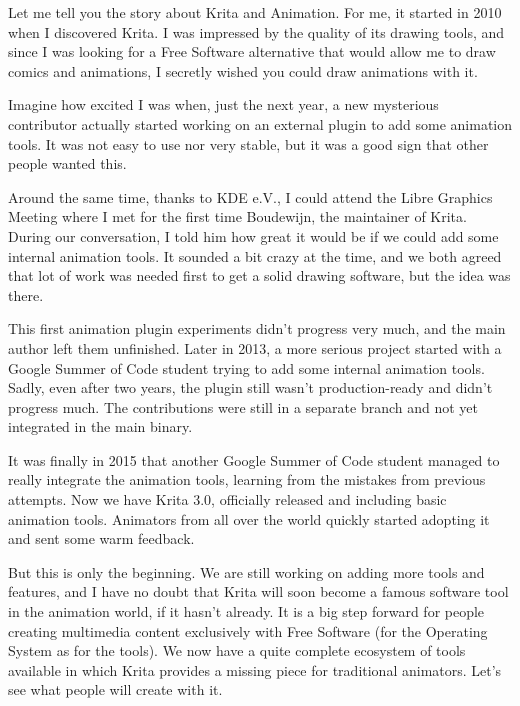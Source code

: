 

\noindent{}Let me tell you the story about Krita and Animation. For me, it started in 2010 when I discovered Krita. I was impressed by the quality of its drawing tools, and since I was looking for a Free Software alternative that would allow me to draw comics and animations, I secretly wished you could draw animations with it. 

Imagine how excited I was when, just the next year, a new mysterious contributor actually started working on an external plugin to add some animation tools. It was not easy to use nor very stable, but it was a good sign that other people wanted this. 

Around the same time, thanks to KDE e.V., I could attend the Libre Graphics Meeting where I met for the first time Boudewijn, the maintainer of Krita. During our conversation, I told him how great it would be if we could add some internal animation tools. It sounded a bit crazy at the time, and we both agreed that lot of work was needed first to get a solid drawing software, but the idea was there.

This first animation plugin experiments didn’t progress very much, and the main author left them unfinished. Later in 2013, a more serious project started with a Google Summer of Code student trying to add some internal animation tools. Sadly, even after two years, the plugin still wasn’t production-ready and didn’t progress much. The contributions were still in a separate branch and not yet integrated in the main binary.

It was finally in 2015 that another Google Summer of Code student managed to really integrate the animation tools, learning from the mistakes from previous attempts. Now we have Krita 3.0, officially released and including basic animation tools. Animators from all over the world quickly started adopting it and sent some warm feedback.

But this is only the beginning. We are still working on adding more tools and features, and I have no doubt that Krita will soon become a famous software tool in the animation world, if it hasn’t already. It is a big step forward for people creating multimedia content exclusively with Free Software (for the Operating System as for the tools). We now have a quite complete ecosystem of tools available in which Krita provides a missing piece for traditional animators. Let’s see what people will create with it.

